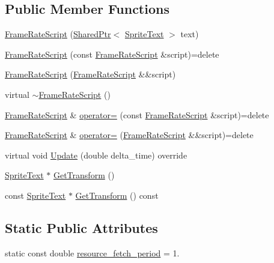 \subsection*{Public Member Functions}
\begin{DoxyCompactItemize}
\item 
\hyperlink{classmage_1_1_frame_rate_script_a8ef13ffd08a684cbc2010b0e4594d4cf}{Frame\+Rate\+Script} (\hyperlink{namespacemage_a1e01ae66713838a7a67d30e44c67703e}{Shared\+Ptr}$<$ \hyperlink{classmage_1_1_sprite_text}{Sprite\+Text} $>$ text)
\item 
\hyperlink{classmage_1_1_frame_rate_script_a2c76a1ce175c5c5370582d7ccb878132}{Frame\+Rate\+Script} (const \hyperlink{classmage_1_1_frame_rate_script}{Frame\+Rate\+Script} \&script)=delete
\item 
\hyperlink{classmage_1_1_frame_rate_script_af2cb69b7338169598b80938e9ad77cdd}{Frame\+Rate\+Script} (\hyperlink{classmage_1_1_frame_rate_script}{Frame\+Rate\+Script} \&\&script)
\item 
virtual \hyperlink{classmage_1_1_frame_rate_script_a0863d9339500e10d988dd574448c28f3}{$\sim$\+Frame\+Rate\+Script} ()
\item 
\hyperlink{classmage_1_1_frame_rate_script}{Frame\+Rate\+Script} \& \hyperlink{classmage_1_1_frame_rate_script_a2077ec2facadcde117a20d18e2f0e9b7}{operator=} (const \hyperlink{classmage_1_1_frame_rate_script}{Frame\+Rate\+Script} \&script)=delete
\item 
\hyperlink{classmage_1_1_frame_rate_script}{Frame\+Rate\+Script} \& \hyperlink{classmage_1_1_frame_rate_script_a828664f89350ac0da2da3da26c05a6f0}{operator=} (\hyperlink{classmage_1_1_frame_rate_script}{Frame\+Rate\+Script} \&\&script)=delete
\item 
virtual void \hyperlink{classmage_1_1_frame_rate_script_a9bab0b26279823f1387428268b30e034}{Update} (double delta\+\_\+time) override
\item 
\hyperlink{classmage_1_1_sprite_text}{Sprite\+Text} $\ast$ \hyperlink{classmage_1_1_frame_rate_script_a23f833cb5a8b78fb38a47ac0db2305a8}{Get\+Transform} ()
\item 
const \hyperlink{classmage_1_1_sprite_text}{Sprite\+Text} $\ast$ \hyperlink{classmage_1_1_frame_rate_script_ab257acb42811f46fcb2aa90781dcdc28}{Get\+Transform} () const
\end{DoxyCompactItemize}
\subsection*{Static Public Attributes}
\begin{DoxyCompactItemize}
\item 
static const double \hyperlink{classmage_1_1_frame_rate_script_a34e734aedfe92891d87e5419ff60f4f2}{resource\+\_\+fetch\+\_\+period} = 1.
\end{DoxyCompactItemize}
